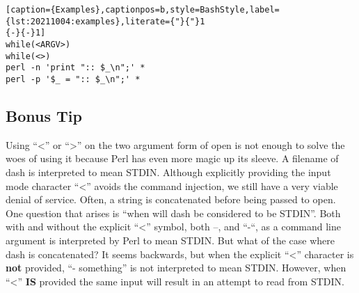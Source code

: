 \begin{lstlisting}[caption={Examples},captionpos=b,style=BashStyle,label={lst:20211004:examples},literate={"}{"}1
{-}{-}1]
while(<ARGV>)
while(<>)
perl -n 'print ":: $_\n";' *
perl -p '$_ = ":: $_\n";' *
\end{lstlisting}

\subsection{Bonus Tip}
Using ``<'' or ``>'' on the two argument form of open is not enough to solve the woes of using it because Perl has even more magic up its sleeve. A filename of dash is interpreted to mean STDIN. Although explicitly providing the input mode character ``<'' avoids the command injection, we still have a very viable denial of service. Often, a string is concatenated before being passed to open. One question that arises is ``when will dash be considered to be STDIN''. Both with and without the explicit ``<'' symbol, both –, and ``-``, as a command line argument is interpreted by Perl to mean STDIN. But what of the case where dash is concatenated? It seems backwards, but when the explicit ``<'' character is \textbf{not} provided, ``- something'' is not interpreted to mean STDIN. However, when ``<'' \textbf{IS} provided the same input will result in an attempt to read from STDIN.
